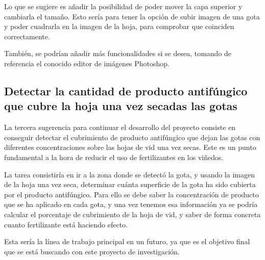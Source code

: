 Lo que se sugiere es añadir la posibilidad de poder mover la capa superior y cambiarla el tamaño. Esto sería para tener la opción de subir imagen de una gota y poder cuadrarla en la imagen de la hoja, para comprobar que coinciden correctamente.

También, se podrían añadir más funcionalidades si se desea, tomando de referencia el conocido editor de imágenes Photoshop.

\subsection{Detectar la cantidad de producto antifúngico que cubre la hoja una vez secadas las gotas}
La tercera sugerencia para continuar el desarrollo del proyecto consiste en conseguir detectar el cubrimiento de producto antifúngico que dejan las gotas con diferentes concentraciones sobre las hojas de vid una vez secas. Este es un punto fundamental a la hora de reducir el uso de fertilizantes en los viñedos. 

La tarea consistiría en ir a la zona donde se detectó la gota, y usando la imagen de la hoja una vez seca, determinar cuánta superficie de la gota ha sido cubierta por el producto antifúngico. Para ello se debe saber la concentración de producto que se ha aplicado en cada gota, y una vez tenemos esa información ya se podría calcular el porcentaje de cubrimiento de la hoja de vid, y saber de forma concreta cuanto fertilizante está haciendo efecto. 

Esta sería la línea de trabajo principal en un futuro, ya que es el objetivo final que se está buscando con este proyecto de investigación.